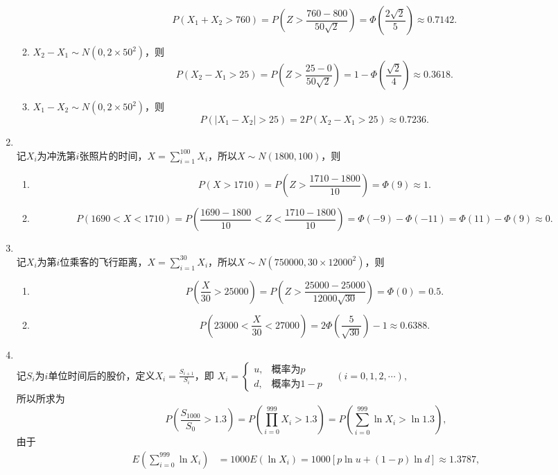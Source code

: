 \begin{enumerate}[label=\arabic{section}.\arabic*]
\begin{enumerate}[label=\alph*)]
        \[P(X_1+X_2>760)=P\left(Z>\frac{760-800}{50\sqrt{2}}\right)=\Phi\left(\frac{2\sqrt{2}}{5}\right)\approx 0.7142.\]
        \item $X_2-X_1 \sim N(0, 2\times50^2)$，则
        \[P(X_2-X_1>25)=P\left(Z>\frac{25-0}{50\sqrt{2}}\right)=1-\Phi\left(\frac{\sqrt{2}}{4}\right)\approx 0.3618.\]
        \item $X_1-X_2 \sim N(0, 2\times50^2)$，则
        \[P(|X_1-X_2|>25)=2P(X_2-X_1>25)\approx 0.7236.\]
    \end{enumerate}
    \item \sol\\
    记$X_i$为冲洗第$i$张照片的时间，$\displaystyle X=\sum_{i=1}^{100} X_i$，所以$X \sim N(1800,100)$，则
    \begin{enumerate}[label=\alph*)]
        \item \[P(X>1710)=P\left(Z>\frac{1710-1800}{10}\right)=\Phi(9)\approx 1.\]
        \item \[P(1690<X<1710)=P\left(\frac{1690-1800}{10}<Z<\frac{1710-1800}{10}\right)=\Phi(-9)-\Phi(-11)=\Phi(11)-\Phi(9)\approx 0.\]
    \end{enumerate}
    \item \sol\\
    记$X_i$为第$i$位乘客的飞行距离，$\displaystyle X=\sum_{i=1}^{30} X_i$，所以$X \sim N(750000,30\times12000^2)$，则
    \begin{enumerate}[label=\alph*)]
        \item \[P\left(\frac{X}{30}>25000\right)=P\left(Z>\frac{25000-25000}{12000\sqrt{30}}\right)=\Phi(0)=0.5.\]
        \item \[P\left(23000<\frac{X}{30}<27000\right)=2\Phi\left(\frac{5}{\sqrt{30}}\right)-1\approx 0.6388.\]
    \end{enumerate}
    \item \sol\\
    记$S_i$为$i$单位时间后的股价，定义$\displaystyle X_i=\frac{S_{i+1}}{S_i}$，即 $\displaystyle X_i = \begin{cases}
        u, & \text{概率为}p \\ d, & \text{概率为}1-p
    \end{cases} \quad (i=0,1,2,\cdots),$\\
    所以所求为\[P\left(\frac{S_{1000}}{S_0}>1.3\right)=P\left(\prod_{i=0}^{999}X_i>1.3\right)=P\left(\sum_{i=0}^{999} \ln X_i > \ln 1.3\right),\]
    由于
    \begin{align*}
        E\left(\sum_{i=0}^{999} \ln X_i\right)&=1000E(\ln X_i)=1000[p\ln u+(1-p)\ln d] \approx 1.3787,\\

\end{align*}
\end{enumerate}
